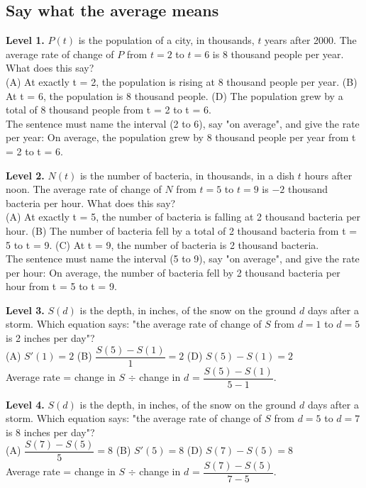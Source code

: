 \documentclass[11pt]{article}
\begin{document}
\subsection*{Say what the average means}
\noindent\textbf{Level 1.} $P(t)$ is the population of a city, in thousands, $t$ years after 2000. The average rate of change of $P$ from $t=2$ to $t=6$ is $8$ thousand people per year. What does this say?\\ (A) At exactly t = 2, the population is rising at 8 thousand people per year. \quad (B) At t = 6, the population is 8 thousand people. \quad {} \quad (D) The population grew by a total of 8 thousand people from t = 2 to t = 6.\\  \quad The sentence must name the interval (2 to 6), say "on average", and give the rate per year: On average, the population grew by 8 thousand people per year from t = 2 to t = 6.\par\medskip
\noindent\textbf{Level 2.} $N(t)$ is the number of bacteria, in thousands, in a dish $t$ hours after noon. The average rate of change of $N$ from $t=5$ to $t=9$ is $-2$ thousand bacteria per hour. What does this say?\\ (A) At exactly t = 5, the number of bacteria is falling at 2 thousand bacteria per hour. \quad (B) The number of bacteria fell by a total of 2 thousand bacteria from t = 5 to t = 9. \quad (C) At t = 9, the number of bacteria is 2 thousand bacteria. \quad {}\\  \quad The sentence must name the interval (5 to 9), say "on average", and give the rate per hour: On average, the number of bacteria fell by 2 thousand bacteria per hour from t = 5 to t = 9.\par\medskip
\noindent\textbf{Level 3.} $S(d)$ is the depth, in inches, of the snow on the ground $d$ days after a storm. Which equation says: "the average rate of change of $S$ from $d=1$ to $d=5$ is 2 inches per day"?\\ (A) $S'(1)=2$ \quad (B) $\dfrac{S(5)-S(1)}{1}=2$ \quad {} \quad (D) $S(5)-S(1)=2$\\  \quad Average rate = change in $S$ $\div$ change in $d$ = $\dfrac{S(5)-S(1)}{5-1}$.\par\medskip
\noindent\textbf{Level 4.} $S(d)$ is the depth, in inches, of the snow on the ground $d$ days after a storm. Which equation says: "the average rate of change of $S$ from $d=5$ to $d=7$ is 8 inches per day"?\\ (A) $\dfrac{S(7)-S(5)}{5}=8$ \quad (B) $S'(5)=8$ \quad {} \quad (D) $S(7)-S(5)=8$\\  \quad Average rate = change in $S$ $\div$ change in $d$ = $\dfrac{S(7)-S(5)}{7-5}$.\par\medskip
\end{document}
